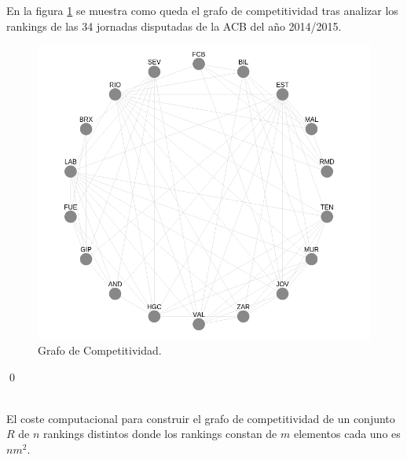 \begin{ejem} En la figura \ref{fig:gcomp} se muestra como queda el grafo de competitividad tras analizar los rankings de las 34 jornadas disputadas de la ACB del año 2014/2015.
\end{ejem}	
	\begin{figure}[H]
		\centering
		\includegraphics[scale=0.6]{images/Grafo_competitividad.png}
		\caption{Grafo de Competitividad.} \label{fig:gcomp}
	\end{figure}
	
\qed

\ \\

El coste computacional para construir el grafo de competitividad de un conjunto $R$ de $n$ rankings distintos donde los rankings constan de $m$ elementos cada uno es $nm^{2}$.